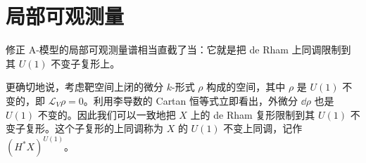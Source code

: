 
\section{局部可观测量}

修正 A-模型的局部可观测量谱相当直截了当：它就是把 de Rham 上同调限制到其 $U(1)$ 不变子复形上。

更确切地说，考虑靶空间上闭的微分 $k$-形式 $\rho$ 构成的空间，其中 $\rho$ 是 $U(1)$ 不变的，即 $\mathcal{L}_V\rho=0$。利用李导数的 Cartan 恒等式立即看出，外微分 $\dd\rho$ 也是 $U(1)$ 不变的。因此我们可以一致地把 $X$ 上的 de Rham 复形限制到其 $U(1)$ 不变子复形。这个子复形的上同调称为 $X$ 的 $U(1)$ 不变上同调，记作 $(H^*X)^{U(1)}$。


